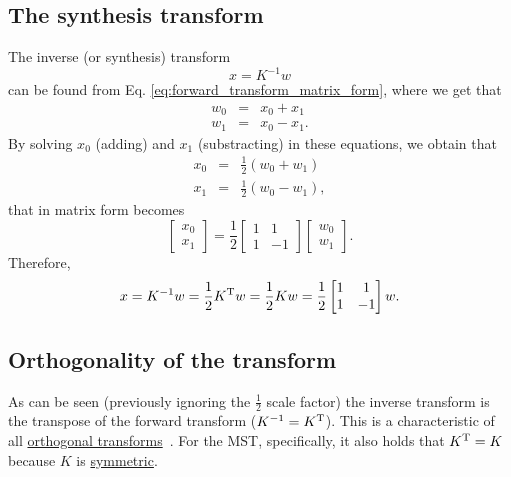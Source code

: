 \subsection{The synthesis transform}
The inverse (or synthesis) transform
\begin{equation}
  x = K^{-1}w
  \label{eq:inverse_transform}
\end{equation}
can be found from Eq. \ref{eq:forward_transform_matrix_form}, where we
get that
\begin{equation}
  \begin{array}{rcl}
  w_0 & = & x_0 + x_1\\
  w_1 & = & x_0 - x_1.
  \end{array}
\end{equation}
By solving $x_0$ (adding) and $x_1$ (substracting) in
these equations, we obtain that
\begin{equation}
  \begin{array}{rcl}
  x_0 & = & \frac{1}{2}(w_0 + w_1)\\
  x_1 & = & \frac{1}{2}(w_0 - w_1),
  \end{array}
\end{equation}
that in matrix form becomes
\begin{equation}
  \begin{bmatrix}
    x_0 \\
    x_1
  \end{bmatrix}
  = \frac{1}{2}
  \begin{bmatrix} 1 & 1 \\ 1 & -1 \end{bmatrix}
  \begin{bmatrix}
    w_0 \\
    w_1
  \end{bmatrix}.
\end{equation}
Therefore,
\begin{equation}
  x = K^{-1}w = \frac{1}{2}K^{\text T}w = \frac{1}{2}Kw = \frac{1}{2}\begin{bmatrix} 1 & 1 \\ 1 & -1 \end{bmatrix}w.
  \label{eq:inverse_transform_matrix_form}
\end{equation}

\subsection{Orthogonality of the transform}
As can be seen (previously ignoring the $\frac{1}{2}$ scale factor)
the inverse transform is the transpose of the forward transform
($K^{-1}=K^{\text T}$). This is a characteristic of all
\href{https://en.wikipedia.org/wiki/Orthogonal_transformation}{orthogonal
  transforms}~\cite{sayood2017introduction}. For the MST,
specifically, it also holds that $K^{\text T}=K$ because $K$ is
\href{https://en.wikipedia.org/wiki/Symmetric_matrix}{symmetric}.

